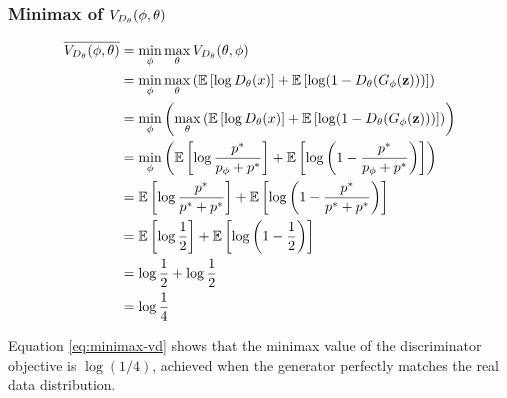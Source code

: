 \subsubsection{Minimax of $V_{D_\theta}(\phi, \theta)$}
\label{sec:minimax-vd}
\begin{align}
	\overline{V_{D_\theta}(\phi, \theta)} & = \min_{\mathbf{\phi}}\max_{\mathbf{\theta}}
	V_{D_\theta}(\theta, \phi) \nonumber                                              \\
	               & = \min_{\mathbf{\phi}}\max_{\mathbf{\theta}} \left (
	\mathbb{E}\left[\log{D_\theta(x)}\right] +
	\mathbb{E}\left[\log(1 -
	D_\theta(G_\phi(\mathbf{z})))\right] \right) \nonumber                                \\
	               & = \min_{\mathbf{\phi}}\left(\max_{\mathbf{\theta}} \left (
		\mathbb{E}\left[\log{D_\theta(x)}\right] +
		\mathbb{E}\left[\log(1 -
				D_\theta(G_\phi(\mathbf{z})))\right] \right)
	\right) \nonumber                                                           \\
	               & = \min_{\phi}\left(\mathbb{E}\left[\log{p^*\over
			p_{\phi}+ p^*}\right] + \mathbb{E}\left[\log\left(1 - {p^* \over
	p_{\phi} + p^*}\right)\right] \right) \nonumber                                  \\
	               & = \mathbb{E}\left[\log{p^*\over p^*+ p^*}\right] +
	\mathbb{E}\left[\log\left(1 - {p^* \over
	p^* + p^*}\right)\right] \nonumber                                          \\
	               & = \mathbb{E}\left[\log{1 \over 2}\right] +
	\mathbb{E}\left[\log{\left(1 - {1 \over 2}\right)}\right] \nonumber         \\
	               & = \log{1 \over 2} + \log{1 \over 2} \nonumber              \\
	               & = \log{1 \over 4} \label{eq:minimax-vd}
\end{align}

Equation \ref{eq:minimax-vd} shows that the minimax value of the discriminator objective is $\log(1/4)$, achieved when the generator perfectly matches the real data distribution.

